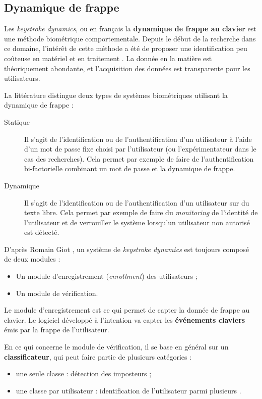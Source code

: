 \subsection{Dynamique de frappe}
\label{subsec:ddf}

Les \textit{keystroke dynamics}, ou en français la \textbf{dynamique de frappe au clavier} est une méthode biométrique comportementale. Depuis le début de la recherche dans ce domaine\cite{rand}, l'intérêt de cette méthode a été de proposer une identification peu coûteuse en matériel et en traitement \cite{monrose1997}. La donnée en la matière est théoriquement abondante, et l'acquisition des données est transparente pour les utilisateurs.

La littérature distingue deux types de systèmes biométriques utilisant la dynamique de frappe :


\begin{description}
  \item[Statique] Il s'agit de l'identification ou de l'authentification d'un utilisateur à l'aide d'un mot de passe fixe choisi par l'utilisateur (ou l'expérimentateur dans le cas des recherches). Cela permet par exemple de faire de l'authentification bi-factorielle combinant un mot de passe et la dynamique de frappe.
  \item[Dynamique] Il s'agit de l'identification ou de l'authentification d'un utilisateur sur du texte libre. Cela permet par exemple de faire du \textit{monitoring} de l'identité de l'utilisateur et de verrouiller le système lorsqu'un utilisateur non autorisé est détecté.
\end{description}

D'après Romain Giot \cite{giotBenchmark}, un système de \textit{keystroke dynamics} est toujours composé de deux modules :

\begin{itemize}
	\item Un module d'enregistrement (\textit{enrollment}) des utilisateurs ;
	\item Un module de vérification.
\end{itemize}

Le module d'enregistrement est ce qui permet de capter la donnée de frappe au clavier. Le logiciel développé à l'intention va capter les \textbf{événements claviers} émis par la frappe de l'utilisateur.

En ce qui concerne le module de vérification, il se base en général sur un \textbf{classificateur}, qui peut faire partie de plusieurs catégories : 

\begin{itemize}
	\item une seule classe : détection des imposteurs ;
	\item une classe par utilisateur : identification de l'utilisateur parmi plusieurs .
\end{itemize}

